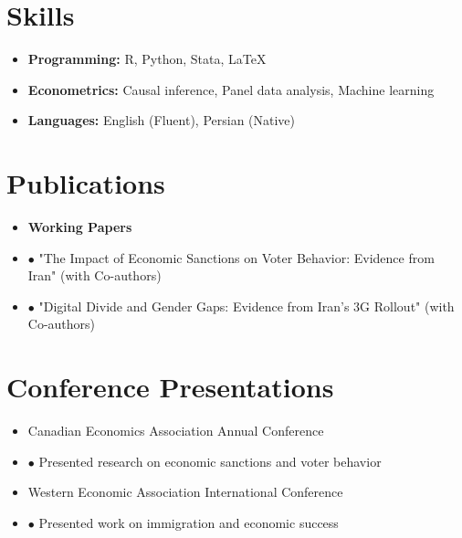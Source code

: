 \documentclass[11pt, a4paper]{article}
\newcommand{\cvsection}[1]{\section*{#1}}
\newcommand{\cvitem}[2]{\item[#1] #2}
\newcommand{\cvsubitem}[1]{\item[] #1}
\begin{document}
\cvsection{Skills}
\begin{itemize}[leftmargin=*]
    \item \textbf{Programming:} R, Python, Stata, LaTeX
    \item \textbf{Econometrics:} Causal inference, Panel data analysis, Machine learning
    \item \textbf{Languages:} English (Fluent), Persian (Native)
\end{itemize}

\cvsection{Publications}
\begin{itemize}[leftmargin=*]
    \item \textbf{Working Papers}
    \cvsubitem{$\bullet$ "The Impact of Economic Sanctions on Voter Behavior: Evidence from Iran" (with Co-authors)}
    \cvsubitem{$\bullet$ "Digital Divide and Gender Gaps: Evidence from Iran's 3G Rollout" (with Co-authors)}
\end{itemize}

\cvsection{Conference Presentations}
\begin{itemize}[leftmargin=*]
    \cvitem{2023}{Canadian Economics Association Annual Conference}
    \cvsubitem{$\bullet$ Presented research on economic sanctions and voter behavior}
    
    \cvitem{2022}{Western Economic Association International Conference}
    \cvsubitem{$\bullet$ Presented work on immigration and economic success}
\end{itemize}
\end{document}

